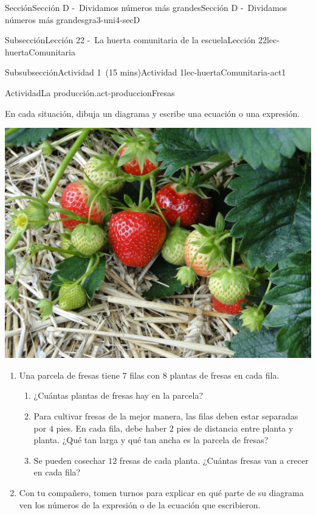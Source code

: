 \documentclass[oneside,10pt,]{article}
\begin{document}
\begin{sectionptx}{Sección}{Sección D -~Dividamos números más grandes}{}{Sección D -~Dividamos números más grandes}{}{}{gra3-uni4-secD}
\begin{subsectionptx}{Subsección}{Lección 22 -~La huerta comunitaria de la escuela}{}{Lección 22}{}{}{lec-huertaComunitaria}
\begin{subsubsectionptx}{Subsubsección}{Actividad 1~(15 mins)}{}{Actividad 1}{}{}{lec-huertaComunitaria-act1}
\begin{activity}{Actividad}{La producción.}{act-produccionFresas}%
\begin{sidebyside}{2}{0.025}{0.025}{0.05}%
\begin{sbspanel}{0.6}%
En cada situación, dibuja un diagrama y escribe una ecuación o una expresión.%
\end{sbspanel}%
\begin{sbspanel}{0.3}%
\includegraphics[width=\linewidth]{external/jpg-source/3-4-D-22 Act1-Fresas.jpg}
\end{sbspanel}%
\end{sidebyside}%
%
\begin{enumerate}
\item{}Una parcela de fresas tiene \(7\) filas con \(8\) plantas de fresas en cada fila.%
%
\begin{enumerate}
\item{}¿Cuántas plantas de fresas hay en la parcela?%
\item{}Para cultivar fresas de la mejor manera, las filas deben estar separadas por \(4\) pies. En cada fila, debe haber \(2\) pies de distancia entre planta y planta. ¿Qué tan larga y qué tan ancha es la parcela de fresas?%
\item{}Se pueden cosechar \(12\) fresas de cada planta. ¿Cuántas fresas van a crecer en cada fila?%
\end{enumerate}
\item{}Con tu compañero, tomen turnos para explicar en qué parte de su diagrama ven los números de la expresión o de la ecuación que escribieron.%
\end{enumerate}

\end{activity}
\end{subsubsectionptx}
\end{subsectionptx}
\end{sectionptx}
\end{document}
